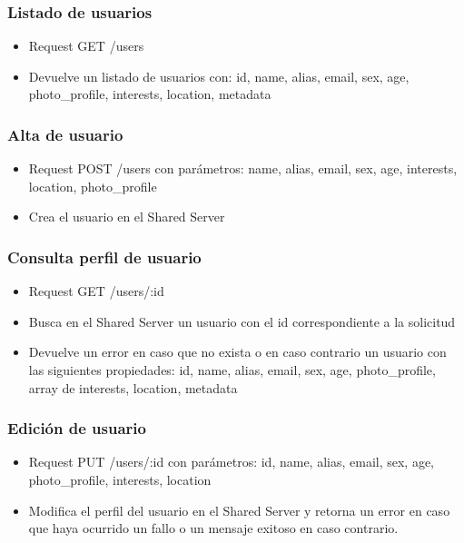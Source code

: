 \documentclass[letterpaper,10pt,english]{sphinxmanual}
\begin{document}
\subsubsection{Listado de usuarios}
\label{manuals:listado-de-usuarios}\begin{itemize}
\item {} 
Request GET /users

\item {} 
Devuelve un listado de usuarios con: id, name, alias, email, sex, age, photo\_profile, interests, location, metadata

\end{itemize}


\subsubsection{Alta de usuario}
\label{manuals:alta-de-usuario}\begin{itemize}
\item {} 
Request POST /users con parámetros: name, alias, email, sex, age, interests, location, photo\_profile

\item {} 
Crea el usuario en el Shared Server

\end{itemize}


\subsubsection{Consulta perfil de usuario}
\label{manuals:consulta-perfil-de-usuario}\begin{itemize}
\item {} 
Request GET /users/:id

\item {} 
Busca en el Shared Server un usuario con el id correspondiente a la solicitud

\item {} 
Devuelve un error en caso que no exista o en caso contrario un usuario con las siguientes propiedades: id, name, alias, email, sex, age, photo\_profile, array de interests, location, metadata

\end{itemize}


\subsubsection{Edición de usuario}
\label{manuals:edicion-de-usuario}\begin{itemize}
\item {} 
Request PUT /users/:id con parámetros: id, name, alias, email, sex, age, photo\_profile, interests, location

\item {} 
Modifica el perfil del usuario en el Shared Server y retorna un error en caso que haya ocurrido un fallo o un mensaje exitoso en caso contrario.

\end{itemize}
\end{document}

